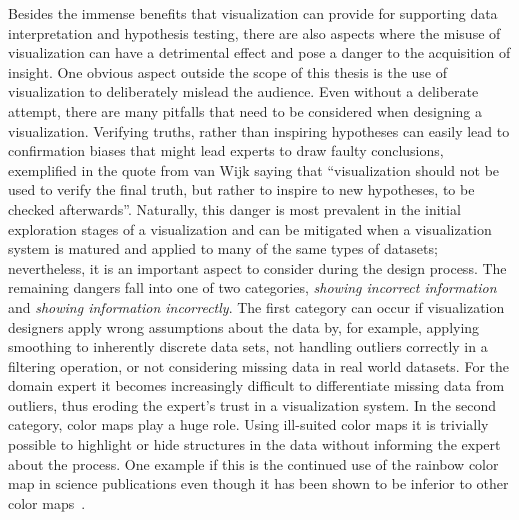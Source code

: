Besides the immense benefits that visualization can provide for supporting data interpretation and hypothesis testing, there are also aspects where the misuse of visualization can have a detrimental effect and pose a danger to the acquisition of insight.  One obvious aspect outside the scope of this thesis is the use of visualization to deliberately mislead the audience.  Even without a deliberate attempt, there are many pitfalls that need to be considered when designing a visualization.  Verifying truths, rather than inspiring hypotheses can easily lead to confirmation biases that might lead experts to draw faulty conclusions, exemplified in the quote from van Wijk saying that ``visualization should not be used to verify the final truth, but rather to inspire to new hypotheses, to be checked afterwards''.  Naturally, this danger is most prevalent in the initial exploration stages of a visualization and can be mitigated when a visualization system is matured and applied to many of the same types of datasets; nevertheless, it is an important aspect to consider during the design process.  The remaining dangers fall into one of two categories, \emph{showing incorrect information} and \emph{showing information incorrectly}.  The first category can occur if visualization designers apply wrong assumptions about the data by, for example, applying smoothing to inherently discrete data sets, not handling outliers correctly in a filtering operation, or not considering missing data in real world datasets.  For the domain expert it becomes increasingly difficult to differentiate missing data from outliers, thus eroding the expert's trust in a visualization system.  In the second category, color maps play a huge role.  Using ill-suited color maps it is trivially possible to highlight or hide structures in the data without informing the expert about the process.  One example if this is the continued use of the rainbow color map in science publications even though it has been shown to be inferior to other color maps~\cite{borland2007rainbow}.



